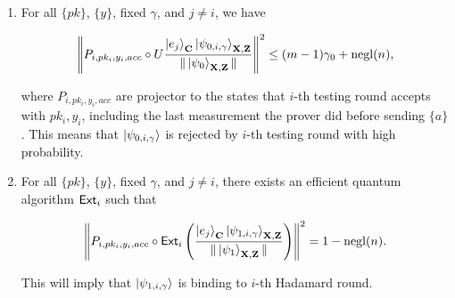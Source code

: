 \begin{lemma}
\begin{enumerate}
        \item \label{property:partition-testing}
For all $\{pk\}$, $\{y\}$, fixed $\gamma$, and  $j\neq i$, we have 
 

 \begin{align}
    \left\lVert P_{i,pk_i,y_i,acc} \circ U\frac{\ket{e_j}_{\mathbf{C}}\ket{\psi_{0,i,\gamma}}_{\mathbf{X},\mathbf{Z}}}{\|\ket{\psi_0}_{\mathbf{X},\mathbf{Z}}\|}\right\rVert^2 \leq (m-1)\gamma_0+\operatorname{negl}(n),
 \end{align}
 
 
where $P_{i,pk_i,y_i,acc}$ are projector to the states that $i$-th testing round accepts with $pk_i,y_i$, including the last measurement the prover did before sending $\{a\}$.  This means that $\ket{\psi_{0,i,\gamma}}$ is rejected by $i$-th testing round with high probability.


    \item \label{property:partition-binding}
    
For all $\{pk\}$, $\{y\}$, fixed $\gamma$, and $j\neq i$, there exists an efficient quantum algorithm $\mathsf{Ext}_i$ such that 

\begin{align}
     \left\lVert P_{i,pk_i,y_i,acc} \circ \mathsf{Ext}_i\left(\frac{\ket{e_j}_{\mathbf{C}}\ket{\psi_{1,i,\gamma}}_{\mathbf{X},\mathbf{Z}}}{\|\ket{\psi_1}_{\mathbf{X},\mathbf{Z}}\|}\right)\right\rVert^2 =1-\operatorname{negl}(n).
\end{align}

This will imply that    $\ket{\psi_{1,i,\gamma}}$ is binding to $i$-th Hadamard round.


\end{enumerate}
\end{lemma}

